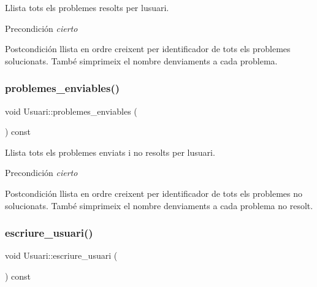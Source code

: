 Llista tots els problemes resolts per l\textquotesingle{}usuari. 

\begin{DoxyPrecond}{Precondición}
{\itshape cierto} 
\end{DoxyPrecond}
\begin{DoxyPostcond}{Postcondición}
llista en ordre creixent per identificador de tots els problemes solucionats. També s\textquotesingle{}imprimeix el nombre d\textquotesingle{}enviaments a cada problema. 
\end{DoxyPostcond}
\mbox{\label{class_usuari_a84e0532f6b7ae4c4022e4739ca7abade}} 
\subsubsection{\texorpdfstring{problemes\+\_\+enviables()}{problemes\_enviables()}}
{\footnotesize\ttfamily void Usuari\+::problemes\+\_\+enviables (\begin{DoxyParamCaption}{ }\end{DoxyParamCaption}) const}



Llista tots els problemes enviats i no resolts per l\textquotesingle{}usuari. 

\begin{DoxyPrecond}{Precondición}
{\itshape cierto} 
\end{DoxyPrecond}
\begin{DoxyPostcond}{Postcondición}
llista en ordre creixent per identificador de tots els problemes no solucionats. També s\textquotesingle{}imprimeix el nombre d\textquotesingle{}enviaments a cada problema no resolt. 
\end{DoxyPostcond}
\mbox{\label{class_usuari_ad13c0b52f5430b0b400c7e3ac6611310}} 
\subsubsection{\texorpdfstring{escriure\+\_\+usuari()}{escriure\_usuari()}}
{\footnotesize\ttfamily void Usuari\+::escriure\+\_\+usuari (\begin{DoxyParamCaption}{ }\end{DoxyParamCaption}) const}




